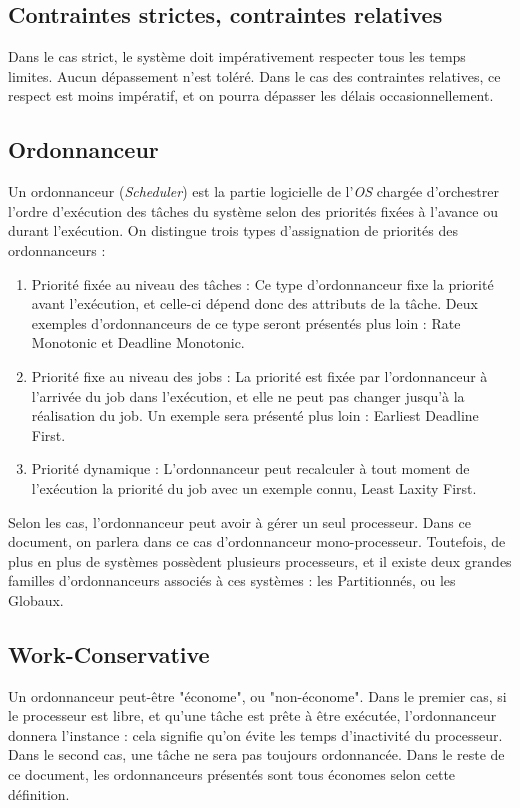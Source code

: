 \documentclass[11pt,a4paper,oneside]{report}
\begin{document}
\subsection{Contraintes strictes, contraintes relatives} 
Dans le cas strict, le système doit impérativement respecter tous les temps limites. Aucun dépassement n'est toléré. Dans le cas des contraintes relatives, ce respect 
est moins impératif, et on pourra dépasser les délais occasionnellement. \\


\subsection{Ordonnanceur}
Un ordonnanceur (\textit{Scheduler}) est la partie logicielle de 
l'\textit{OS} chargée d'orchestrer l'ordre d'exécution des tâches du système 
selon des priorités fixées à l'avance ou durant l'exécution. 
On distingue trois types d'assignation de priorités des ordonnanceurs : \\
\begin{enumerate}
	\item Priorité fixée au niveau des tâches : Ce type d'ordonnanceur fixe la priorité 
	avant l'exécution, et celle-ci dépend donc des attributs de la tâche. 
	Deux exemples d'ordonnanceurs de ce type seront présentés plus loin : Rate Monotonic et 
	Deadline Monotonic.
	\item Priorité fixe au niveau des jobs : La priorité est fixée par l'ordonnanceur à l'arrivée du job 
	dans l'exécution, et elle ne peut pas changer jusqu'à la réalisation du job. Un exemple sera présenté plus loin : Earliest Deadline First.
	\item Priorité dynamique : L'ordonnanceur peut recalculer à tout moment de l'exécution 
	la priorité du job avec un exemple connu, Least Laxity First\cite{hutchison_predictability_2006}.
\end{enumerate}
	
Selon les cas, l'ordonnanceur peut avoir à gérer un seul processeur. Dans ce 
document, on parlera dans ce cas d'ordonnanceur mono-processeur. Toutefois, de plus en 
plus de systèmes possèdent plusieurs processeurs, et il existe deux grandes familles 
d'ordonnanceurs associés à ces systèmes : les Partitionnés, ou les Globaux. \\

\subsection{Work-Conservative} 
Un ordonnanceur peut-être "économe", ou "non-économe". Dans le premier cas, si le processeur est libre, 
et qu'une tâche est prête à être exécutée, l'ordonnanceur donnera l'instance : cela signifie 
qu'on évite les temps d'inactivité du processeur. Dans le second cas, une tâche ne sera pas toujours ordonnancée.
Dans le reste de ce document, les ordonnanceurs présentés sont tous économes selon cette définition.
\end{document}

